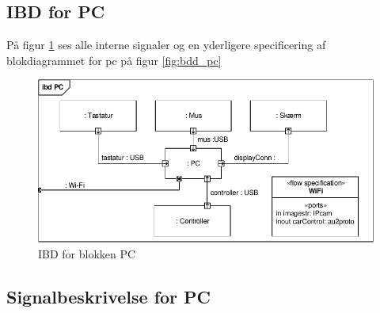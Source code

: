 \subsection{IBD for PC}

På figur \ref{fig:ibd_pc} ses alle interne signaler og en yderligere specificering af blokdiagrammet for pc på figur \ref{fig:bdd_pc}

\begin{figure}[h]
\centering
\includegraphics[scale=1]{../fig/diagrammer/pc/ibd_pc.pdf}
\caption{IBD for blokken PC}
\label{fig:ibd_pc}
\end{figure}

\subsection{Signalbeskrivelse for PC}

